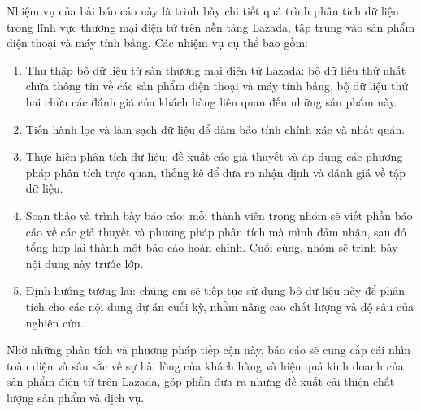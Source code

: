 Nhiệm vụ của bài báo cáo này là trình bày chi tiết quá trình phân tích dữ liệu trong lĩnh vực thương mại điện tử trên nền tảng Lazada, tập trung vào sản phẩm điện thoại và máy tính bảng. Các nhiệm vụ cụ thể bao gồm:

\begin{enumerate}
    \item Thu thập bộ dữ liệu từ sàn thương mại điện tử Lazada: bộ dữ liệu thứ nhất chứa thông tin về các sản phẩm điện thoại và máy tính bảng, bộ dữ liệu thứ hai chứa các đánh giá của khách hàng liên quan đến những sản phẩm này.
    \item Tiến hành lọc và làm sạch dữ liệu để đảm bảo tính chính xác và nhất quán.
    \item Thực hiện phân tích dữ liệu: đề xuất các giả thuyết và áp dụng các phương pháp phân tích trực quan, thống kê để đưa ra nhận định và đánh giá về tập dữ liệu. 
    \item Soạn thảo và trình bày báo cáo: mỗi thành viên trong nhóm sẽ viết phần báo cáo về các giả thuyết và phương pháp phân tích mà mình đảm nhận, sau đó tổng hợp lại thành một báo cáo hoàn chỉnh. Cuối cùng, nhóm sẽ trình bày nội dung này trước lớp.
    \item Định hướng tương lai: chúng em sẽ tiếp tục sử dụng bộ dữ liệu này để phân tích cho các nội dung dự án cuối kỳ, nhằm nâng cao chất lượng và độ sâu của nghiên cứu.
\end{enumerate}

Nhờ những phân tích và phương pháp tiếp cận này, báo cáo sẽ cung cấp cái nhìn toàn diện và sâu sắc về sự hài lòng của khách hàng và hiệu quả kinh doanh của sản phẩm điện tử trên Lazada, góp phần đưa ra những đề xuất cải thiện chất lượng sản phẩm và dịch vụ.




